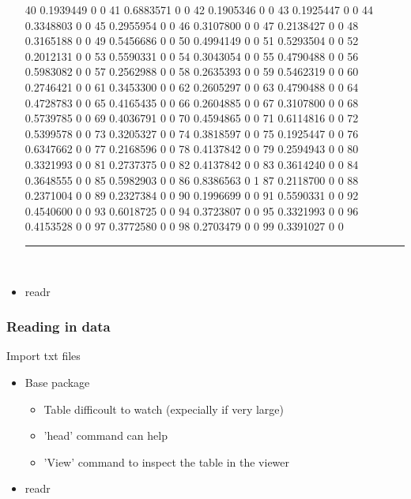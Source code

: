 \documentclass{beamer}
\begin{document}
\begin{frame}[fragile]
\begin{itemize}
\begin{Schunk}
\begin{Soutput}
40   0.1939449   0   0
41   0.6883571   0   0
42   0.1905346   0   0
43   0.1925447   0   0
44   0.3348803   0   0
45   0.2955954   0   0
46   0.3107800   0   0
47   0.2138427   0   0
48   0.3165188   0   0
49   0.5456686   0   0
50   0.4994149   0   0
51   0.5293504   0   0
52   0.2012131   0   0
53   0.5590331   0   0
54   0.3043054   0   0
55   0.4790488   0   0
56   0.5983082   0   0
57   0.2562988   0   0
58   0.2635393   0   0
59   0.5462319   0   0
60   0.2746421   0   0
61   0.3453300   0   0
62   0.2605297   0   0
63   0.4790488   0   0
64   0.4728783   0   0
65   0.4165435   0   0
66   0.2604885   0   0
67   0.3107800   0   0
68   0.5739785   0   0
69   0.4036791   0   0
70   0.4594865   0   0
71   0.6114816   0   0
72   0.5399578   0   0
73   0.3205327   0   0
74   0.3818597   0   0
75   0.1925447   0   0
76   0.6347662   0   0
77   0.2168596   0   0
78   0.4137842   0   0
79   0.2594943   0   0
80   0.3321993   0   0
81   0.2737375   0   0
82   0.4137842   0   0
83   0.3614240   0   0
84   0.3648555   0   0
85   0.5982903   0   0
86   0.8386563   0   1
87   0.2118700   0   0
88   0.2371004   0   0
89   0.2327384   0   0
90   0.1996699   0   0
91   0.5590331   0   0
92   0.4540600   0   0
93   0.6018725   0   0
94   0.3723807   0   0
95   0.3321993   0   0
96   0.4153528   0   0
97   0.3772580   0   0
98   0.2703479   0   0
99   0.3391027   0   0
\end{Soutput}
\end{Schunk}
\rule{\textwidth}{0.4pt}\\
\small
		
		\item readr

	\end{itemize}
\end{frame}

\begin{frame}[fragile]
	\frametitle{Reading in data}
	\centering \Large Import txt files
	\begin{itemize}
		\small
		\item Base package
			\begin{itemize}
				\item Table difficoult to watch (expecially if very large) 
				\item 'head' command can help
				\item 'View' command to inspect the table in the viewer
			\end{itemize}
		\item readr

	\end{itemize}
\end{frame}
\end{document}
